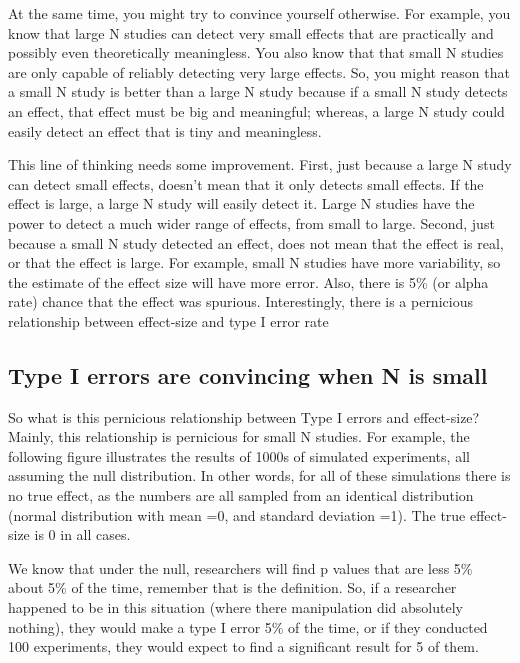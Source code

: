 \documentclass[
]{book}
\begin{document}
At the same time, you might try to convince yourself otherwise. For example, you know that large N studies can detect very small effects that are practically and possibly even theoretically meaningless. You also know that that small N studies are only capable of reliably detecting very large effects. So, you might reason that a small N study is better than a large N study because if a small N study detects an effect, that effect must be big and meaningful; whereas, a large N study could easily detect an effect that is tiny and meaningless.

This line of thinking needs some improvement. First, just because a large N study can detect small effects, doesn't mean that it only detects small effects. If the effect is large, a large N study will easily detect it. Large N studies have the power to detect a much wider range of effects, from small to large. Second, just because a small N study detected an effect, does not mean that the effect is real, or that the effect is large. For example, small N studies have more variability, so the estimate of the effect size will have more error. Also, there is 5\% (or alpha rate) chance that the effect was spurious. Interestingly, there is a pernicious relationship between effect-size and type I error rate

\hypertarget{type-i-errors-are-convincing-when-n-is-small}{%
\subsection{Type I errors are convincing when N is small}\label{type-i-errors-are-convincing-when-n-is-small}}

So what is this pernicious relationship between Type I errors and effect-size? Mainly, this relationship is pernicious for small N studies. For example, the following figure illustrates the results of 1000s of simulated experiments, all assuming the null distribution. In other words, for all of these simulations there is no true effect, as the numbers are all sampled from an identical distribution (normal distribution with mean =0, and standard deviation =1). The true effect-size is 0 in all cases.

We know that under the null, researchers will find p values that are less 5\% about 5\% of the time, remember that is the definition. So, if a researcher happened to be in this situation (where there manipulation did absolutely nothing), they would make a type I error 5\% of the time, or if they conducted 100 experiments, they would expect to find a significant result for 5 of them.
\end{document}
